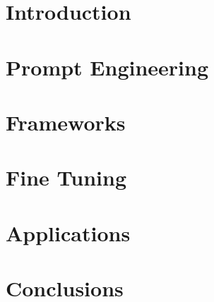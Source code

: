 \section[Intro]{Introduction}




\section[Prompts]{Prompt Engineering}


\section[Frameworks]{Frameworks}








\section[Consult]{Fine Tuning}


\section[Apps]{Applications}


\section[Concl]{Conclusions}



